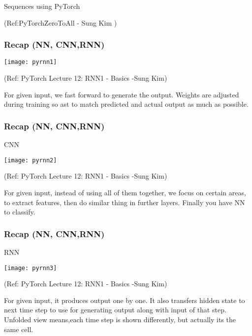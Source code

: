 
\begin{frame}
  \begin{center}
    {\Large Sequences using PyTorch}
    
\tiny{(Ref:PyTorchZeroToAll  - Sung Kim )}
  \end{center}
\end{frame}



\begin{frame}[fragile] \frametitle{Recap (NN, CNN,RNN)}
\begin{center}
\texttt{[image: pyrnn1]}

\tiny{(Ref: PyTorch Lecture 12: RNN1 - Basics -Sung Kim)}
\end{center}
For given input, we fast forward to generate the output. Weights are adjusted during training so ast to match predicted and actual output as much as possible.
\end{frame}

\begin{frame}[fragile] \frametitle{Recap (NN, CNN,RNN)}
CNN
\begin{center}
\texttt{[image: pyrnn2]}

\tiny{(Ref: PyTorch Lecture 12: RNN1 - Basics -Sung Kim)}
\end{center}
For given input, instead of using all of them together, we focus on certain areas, to extract features, then do similar thing in further layers. Finally you have NN to classify.
\end{frame}

\begin{frame}[fragile] \frametitle{Recap (NN, CNN,RNN)}
RNN
\begin{center}
\texttt{[image: pyrnn3]}

\tiny{(Ref: PyTorch Lecture 12: RNN1 - Basics -Sung Kim)}
\end{center}
For given input, it produces output one by one. It also transfers hidden state to next time step to use for generating output along with input of that step.
Unfolded view means,each time step is shown differently, but actually its the same cell.
\end{frame}



